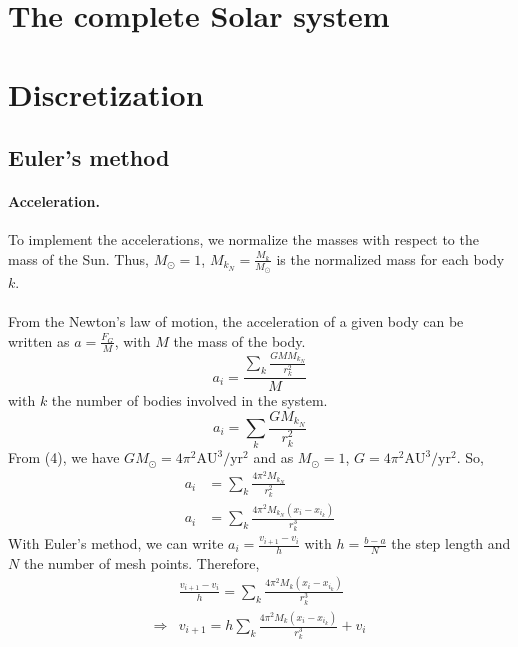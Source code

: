 \documentclass[a4paper, twoside, 11pt]{report}
\theoremstyle{theorem}
\theoremstyle{remark}
\theoremstyle{exemple}
\begin{document}
    \section{The complete Solar system}
        \paragraph{}
        

    \section{Discretization}
        \subsection{Euler's method}
            \paragraph{Acceleration.}To implement the accelerations, we normalize the masses with respect to the mass of the Sun. Thus, $M_{\odot}=1$, $M_{k_N}=\frac{M_k}{M_{\odot}}$ is the normalized mass for each body $k$.
            \paragraph{} From the Newton's law of motion, the acceleration of a given body can be written as $a=\frac{F_G}{M}$, with $M$ the mass of the body. 
                \begin{equation*}
                    a_i = \frac{ \sum\limits_{k} \frac{GMM_{k_N}}{r_k^2}}{M}
                \end{equation*}
            with $k$ the number of bodies involved in the system. 
                \begin{equation*}
                    a_i = \sum\limits_{k} \frac{GM_{k_N}}{r_k^2}
                \end{equation*}
            From (4), we have $GM_{\odot} = 4\pi^2\mathrm{AU}^3/\mathrm{yr}^2$ and as $M_{\odot}=1$, $G=4\pi^2\mathrm{AU}^3/\mathrm{yr}^2$. So,
                \begin{align*}
                    a_i &= \sum\limits_{k} \frac{4\pi^2M_{k_N}}{r_k^2} \\
                    a_i &= \sum\limits_{k} \frac{4\pi^2M_{k_N}(x_i-x_{i_k})}{r_k^3} 
                    \tag{7}
                 \end{align*}
             With Euler's method, we can write $\displaystyle a_i=\frac{v_{i+1} - v_i}{h}$ with $\displaystyle h = \frac{b-a}{N}$ the step length and $N$ the number of mesh points. Therefore, 
                \begin{align*}
                     &\frac{v_{i+1} - v_i}{h} = \sum\limits_{k}\frac{4\pi^2M_k(x_i-x_{i_k})}{r_k^3} \\
                     \Rightarrow &v_{i+1} = h\sum\limits_{k}\frac{4\pi^2M_k(x_i-x_{i_k})}{r_k^3} + v_i
                    \tag{8}
                \end{align*}
\end{document}
